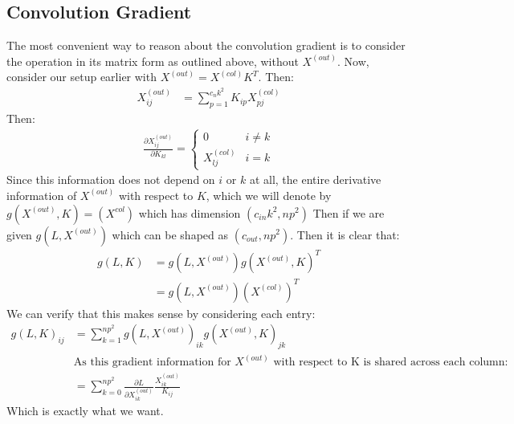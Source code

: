 \documentclass[12pt]{article}
\begin{document}
\subsection*{Convolution Gradient}
The most convenient way to reason about the convolution gradient is to consider
the operation in its matrix form as outlined above, without $X^{(out)}$. Now, consider our setup earlier with
$X^{(out)} = X^{(col)}K^T $. Then:
\begin{align*}
    X^{(out)}_{ij} &= \sum_{p = 1}^{c_nk^2}K_{ip}X^{(col)}_{pj}
\end{align*}
Then:
\begin{align*}
    \frac{\partial  X^{(out)}_{ij}}{\partial K_{kl}} = 
    \begin{cases}
        0 & i \neq k \\
        X^{(col)}_{lj} & i = k
    \end{cases}
\end{align*}
Since this information does not depend on $i$ or $k$ at all, the entire
derivative information of $X^{(out)}$ with respect to $K$, which we will denote
by $g(X^{(out)}, K) = (X^{col})$ which has dimension $(c_{in}k^2, np^2)$
Then if we are given $g(L, X^{(out)})$ which can be shaped as $(c_{out}, np^2)$.
Then it is clear that:
\begin{align*}
    g(L, K) &= g(L, X^{(out)})g(X^{(out)}, K)^T \\
    &=  g(L, X^{(out)})(X^{(col)})^T
\end{align*}
We can verify that this makes sense by considering each entry:
\begin{align*}
    g(L, K)_{ij} &= \sum_{k = 1}^{np^2}g(L, X^{(out)})_{ik}g(X^{(out)}, K)_{jk} \\
    &\text{As this gradient information for $X^{(out)}$ with respect to K is shared across each column:} \\
    &= \sum_{k = 0}^{np^2}\frac{\partial L}{\partial X^{(out)}_{ik}} \frac{X^{(out)}_{ik}}{K_{ij}}
\end{align*}
Which is exactly what we want.
\end{document}
